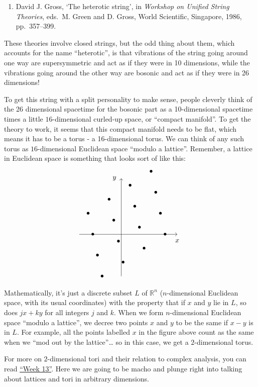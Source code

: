 \documentclass{article}
\def\tightlist{}
\begin{document}
\begin{enumerate}
\def\labelenumi{\arabic{enumi})}
\setcounter{enumi}{4}
\tightlist
\item
  David J. Gross, `The heterotic string', in \emph{Workshop on Unified
  String Theories}, eds.~M. Green and D. Gross, World Scientific,
  Singapore, 1986, pp.~357--399.
\end{enumerate}

These theories involve closed strings, but the odd thing about them,
which accounts for the name ``heterotic'', is that vibrations of the
string going around one way are supersymmetric and act as if they were
in 10 dimensions, while the vibrations going around the other way are
bosonic and act as if they were in 26 dimensions!

To get this string with a split personality to make sense, people
cleverly think of the 26 dimensional spacetime for the bosonic part as a
10-dimensional spacetime times a little \(16\)-dimensional curled-up
space, or ``compact manifold''. To get the theory to work, it seems that
this compact manifold needs to be flat, which means it has to be a torus
- a 16-dimensional torus. We can think of any such torus as
\(16\)-dimensional Euclidean space ``modulo a lattice''. Remember, a
lattice in Euclidean space is something that looks sort of like this: \[
  \begin{tikzpicture}[scale=0.7]
    \draw[->] (-3,0) to (4,0) node[label=below:{$x$}]{};
    \draw[->] (0,-3) to (0,4) node[label=left:{$y$}]{};
    \foreach \m in {-1,0,1,2}
    {
      \foreach \n in {-1,0,1,2}
      {
        \node at ({\m*1.5-\n/3-0.2},{1.5*\n+\m-0.5}) {$\bullet$};
      }
    }
  \end{tikzpicture}
\] Mathematically, it's just a discrete subset \(L\) of \(\mathbb{R}^n\)
(\(n\)-dimensional Euclidean space, with its usual coordinates) with the
property that if \(x\) and \(y\) lie in \(L\), so does \(jx + ky\) for
all integers \(j\) and \(k\). When we form \(n\)-dimensional Euclidean
space ``modulo a lattice'', we decree two points \(x\) and \(y\) to be
the same if \(x-y\) is in \(L\). For example, all the points labelled
\(x\) in the figure above count as the same when we ``mod out by the
lattice''\ldots{} so in this case, we get a \(2\)-dimensional torus.

For more on \(2\)-dimensional tori and their relation to complex
analysis, you can read \protect\hyperlink{week13}{``Week 13''}. Here we
are going to be macho and plunge right into talking about lattices and
tori in arbitrary dimensions.
\end{document}
